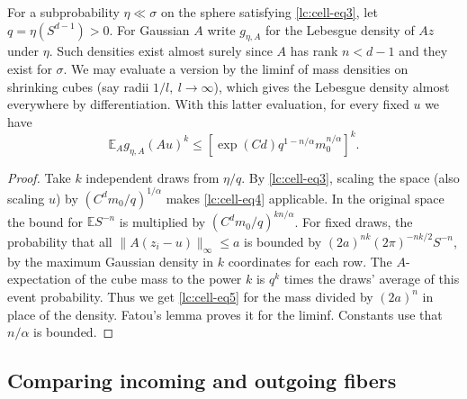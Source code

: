 \begin{lemma}\label{lc:cell-moment}
For a subprobability \(\eta\ll\sigma\) on the sphere satisfying \eqref{lc:cell-eq3}, let \(q=\eta(S^{d-1})>0\). For Gaussian \(A\) write \(g_{\eta,A}\) for the Lebesgue density of \(Az\) under \(\eta\). Such densities exist almost surely since \(A\) has rank \(n<d-1\) and they exist for \(\sigma\). We may evaluate a version by the liminf of mass densities on shrinking cubes (say radii \(1/l,\ l\to\infty\)), which gives the Lebesgue density almost everywhere by differentiation. With this latter evaluation, for every fixed \(u\) we have
\begin{equation}\label{lc:cell-eq5}
\mathbb E_A g_{\eta,A}(Au)^k
 \le \left[\exp(Cd) q^{1-n/\alpha}m_0^{n/\alpha}\right]^k.
\end{equation}
\end{lemma}
\begin{proof}
Take \(k\) independent draws from \(\eta/q\). By \eqref{lc:cell-eq3}, scaling the space (also scaling \(u\)) by \((C^d m_0/q)^{1/\alpha}\) makes \eqref{lc:cell-eq4} applicable. In the original space the bound for \(\mathbb E S^{-n}\) is multiplied by \((C^d m_0/q)^{kn/\alpha}\). For fixed draws, the probability that all \(\|A(z_i-u)\|_\infty\le a\) is bounded by
\((2a)^{nk}(2\pi)^{-nk/2} S^{-n}\), by the maximum Gaussian density in \(k\) coordinates for each row. The \(A\)-expectation of the cube mass to the power \(k\) is \(q^k\) times the draws' average of this event probability. Thus we get \eqref{lc:cell-eq5} for the mass divided by \((2a)^n\) in place of the density. Fatou's lemma proves it for the liminf. Constants use that \(n/\alpha\) is bounded.
\end{proof}

\subsection{Comparing incoming and outgoing fibers}\label{lc:cell-fibers}


